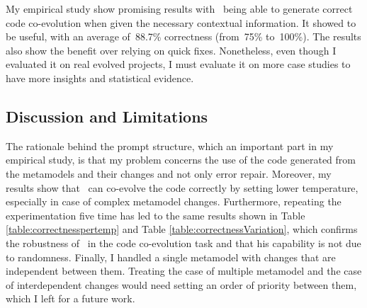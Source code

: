 My empirical study show promising results with \LLM~being able to generate correct code co-evolution when given the necessary contextual information. It showed to be useful, with an average of~88.7\% correctness (from~75\% to~100\%). The results also show the benefit over relying on quick fixes. Nonetheless, even though I evaluated it on real evolved projects, I must evaluate it on more case studies to have more insights and statistical evidence.  %

\subsection{Discussion and Limitations}
The rationale behind the prompt structure, which an important part in my empirical study, is that my problem concerns the use of the code generated from the metamodels and their changes and not only error repair. Moreover, my results show that \LLM~can co-evolve the code correctly by setting lower temperature, especially in case of complex metamodel changes. Furthermore, repeating the experimentation five time has led to the same results shown in Table \ref{table:correctnesspertemp} and Table \ref{table:correctnessVariation}, which confirms the robustness of \LLM~in the code co-evolution task and that his capability is not due to randomness.
Finally, I handled a single metamodel with changes that are independent between them. Treating the case of multiple metamodel and the case of interdependent changes would need setting an order of priority between them, which I left for a future work.
